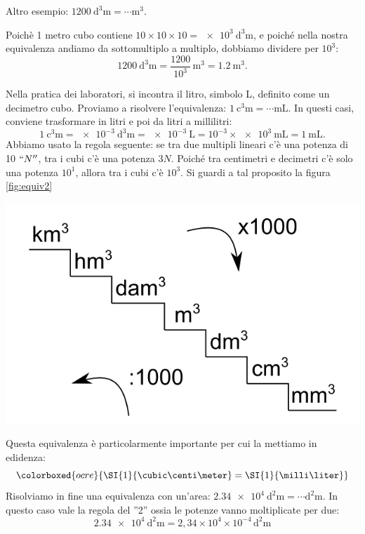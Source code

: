 Altro esempio: $\SI{1200}{\cubic\deci\meter} = \cdots \si{\cubic\meter}$.

Poichè 1 metro cubo contiene  $10\times10\times10 = \SI{e3}{\cubic\deci\meter}$,   e poiché   nella nostra equivalenza andiamo da sottomultiplo a multiplo, dobbiamo dividere per $10^3$:
\[
\SI{1200}{\cubic\deci\meter} = \frac{1200}{10^3}\,\si{\cubic\meter} = \SI{1,2}{\cubic\meter}.
\]

Nella pratica dei laboratori, si incontra il litro, simbolo L, definito come un decimetro cubo. Proviamo a risolvere l'equivalenza: $\SI{1}{\cubic\centi\meter} =\cdots \si{\milli\liter}$. In questi casi, conviene trasformare in litri e poi da litri a millilitri:
\[
\SI{1}{\cubic\centi\meter} = \SI{e-3}{\cubic\deci\meter}= \SI{e-3}{\liter}=10^{-3}\times\SI{e+3}{\milli\liter} =\SI{1}{\milli\liter}.
\]
Abbiamo usato la regola seguente: se tra due multipli lineari c'è una potenza di 10 $``N''$, tra i cubi c'è una potenza $3 N$. Poiché tra centimetri e decimetri c'è solo una potenza $10^1$, allora tra i cubi c'è $10^3$. Si guardi a tal proposito la figura \ref{fig:equiv2}
\vspace{0.5cm}
\begin{minipage}{\linewidth}
	\centering
	\includegraphics[scale=0.3]{equiv2}
	\label{fig:equiv2}
\end{minipage}


Questa equivalenza è particolarmente importante per cui la mettiamo in edidenza:
\[
\colorboxed{ocre}{
\SI{1}{\cubic\centi\meter} = \SI{1}{\milli\liter}
}
\]
Risolviamo in fine una equivalenza con un'area: $\SI{2,34e+4}{\square\deci\meter} = \cdots \si{\square\deca\meter}$. In questo caso vale la regola del ''2'' ossia le potenze vanno moltiplicate per due:
\[
\SI{2,34e+4}{\square\deci\meter} = 2,34\times10^{4}\times 10^{-4}\,\si{\square\deca\meter} 
\]

